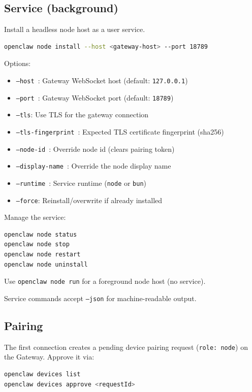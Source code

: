 \subsection{Service (background)}


Install a headless node host as a user service.

\begin{lstlisting}[language=bash]
openclaw node install --host <gateway-host> --port 18789
\end{lstlisting}


Options:

\begin{itemize}
  \item \texttt{--host }: Gateway WebSocket host (default: \texttt{127.0.0.1})
  \item \texttt{--port }: Gateway WebSocket port (default: \texttt{18789})
  \item \texttt{--tls}: Use TLS for the gateway connection
  \item \texttt{--tls-fingerprint }: Expected TLS certificate fingerprint (sha256)
  \item \texttt{--node-id }: Override node id (clears pairing token)
  \item \texttt{--display-name }: Override the node display name
  \item \texttt{--runtime }: Service runtime (\texttt{node} or \texttt{bun})
  \item \texttt{--force}: Reinstall/overwrite if already installed
\end{itemize}


Manage the service:

\begin{lstlisting}[language=bash]
openclaw node status
openclaw node stop
openclaw node restart
openclaw node uninstall
\end{lstlisting}


Use \texttt{openclaw node run} for a foreground node host (no service).

Service commands accept \texttt{--json} for machine-readable output.

\subsection{Pairing}


The first connection creates a pending device pairing request (\texttt{role: node}) on the Gateway.
Approve it via:

\begin{lstlisting}[language=bash]
openclaw devices list
openclaw devices approve <requestId>
\end{lstlisting}



